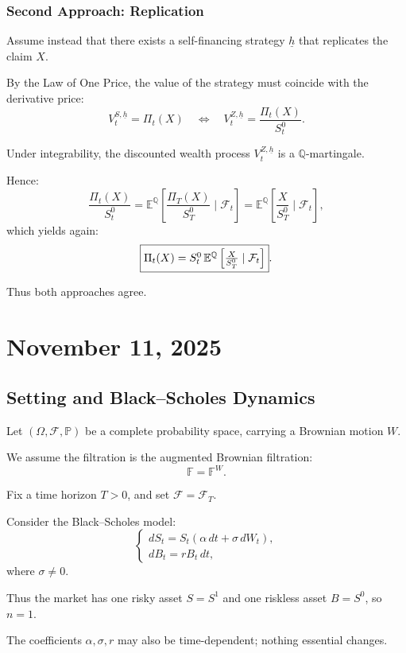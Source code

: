 \documentclass[12pt,a4paper]{article}
\theoremstyle{definition}
\begin{document}
\subsubsection{Second Approach: Replication}

Assume instead that there exists a self-financing strategy $\underline{h}$ that replicates the claim $X$.

By the Law of One Price, the value of the strategy must coincide with the derivative price:
\[
V_t^{S,\underline{h}} = \Pi_t(X) \quad \iff \quad V_t^{Z,\underline{h}} = \frac{\Pi_t(X)}{S_t^0}.
\]

Under integrability, the discounted wealth process $V_t^{Z,\underline{h}}$ is a $\mathbb{Q}$-martingale.

Hence:
\[
\frac{\Pi_t(X)}{S_t^0} = \mathbb{E}^\mathbb{Q}\left[\frac{\Pi_T(X)}{S_T^0} \mid \mathcal{F}_t\right] = \mathbb{E}^\mathbb{Q}\left[\frac{X}{S_T^0} \mid \mathcal{F}_t\right],
\]
which yields again:
\[
\fbox{$\Pi_t(X) = S_t^0 \, \mathbb{E}^\mathbb{Q}\left[\frac{X}{S_T^0} \mid \mathcal{F}_t\right]$}.
\]

Thus both approaches agree.

\newpage
\section{November 11, 2025}

\subsection{Setting and Black--Scholes Dynamics}

Let $(\Omega, \mathcal{F}, \mathbb{P})$ be a complete probability space, carrying a Brownian motion $W$.

We assume the filtration is the augmented Brownian filtration:
\[
\mathbb{F} = \mathbb{F}^W.
\]

Fix a time horizon $T > 0$, and set $\mathcal{F} = \mathcal{F}_T$.

Consider the Black--Scholes model:
\[
\begin{cases}
dS_t = S_t(\alpha \, dt + \sigma \, dW_t), \\
dB_t = r B_t \, dt,
\end{cases}
\]
where $\sigma \neq 0$.

Thus the market has one risky asset $S = S^1$ and one riskless asset $B = S^0$, so $n = 1$.

The coefficients $\alpha, \sigma, r$ may also be time-dependent; nothing essential changes.
\end{document}
